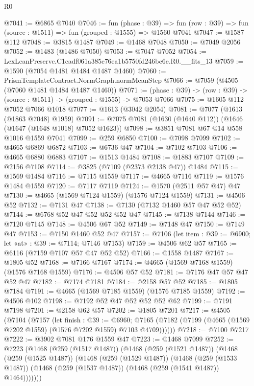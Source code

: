 \begin{lexlean}{R0}
\begin{coremodule}
@7041 := @6865 @7040
@7046 := fun (phase : @39) =>
  fun (row : @39) => fun (source : @1511) => fun (grouped : @1555) => @1560 @7041
@7047 := @1587 @112
@7048 := @3815 @1487
@7049 := @1468 @7048
@7050 := @7049 @2056
@7052 := @1483 (@1486 @7050)
@7053 := @7047 @7052
@7054 := LexLeanPreserve.C1cadf061a385c76ea1b5750fd246bc6e.R0.__fits_13
@7059 := @1590 (@7054 @1481 @1484 @1487 @1460)
@7060 := PrismTemplateContract.NormGraph.normMeanStep
@7066 := @7059 (@4505 (@7060 @1481 @1484 @1487 @1460))
@7071 := (phase : @39) -> (row : @39) -> (source : @1511) -> (grouped : @1555) -> @7053 @7066
@7075 := @1605 @112 @7052 @7066 @1018
@7077 := @1613 (@3042 @2054)
@7081 := @7077 (@1613 (@1863 @7048) @1959)
@7091 := @7075 @7081 (@1630 (@1640 @112)) (@1646 (@1647 (@1648 @1018) @7052 @1623))
@7098 := @3851 @7081 @67 @14 @558 @1016 @1559 @7041
@7099 := @259 @6850
@7100 := @7098 @7099
@7102 := @4665 @6869 @6872
@7103 := @6736 @47
@7104 := @7102 @7103
@7106 := @4665 @6880 @6883
@7107 := @1513 @1484
@7108 := @1883 @7107
@7109 := @2156 @7108
@7114 := @3825 (@7109 (@2373 @2138 @47)) @1484
@7115 := @1569 @1484
@7116 := @7115 @1559
@7117 := @4665 @7116
@7119 := @1576 @1484 @1559
@7120 := @7117 @7119
@7124 := @1570 (@2511 @57 @47) @47
@7130 := @4665 (@1569 @7124 @1559) (@1576 @7124 @1559)
@7131 := @4506 @52
@7132 := @7131 @47
@7138 := @7130 (@7132 @1460 @57 @47 @52 @52)
@7144 := @6768 @52 @47 @52 @52 @52 @47
@7145 := @7138 @7144
@7146 := @7120 @7145
@7148 := @4506 @67 @52
@7149 := @7148 @47
@7150 := @7149 @47
@7153 := @7150 @1460 @52 @47
@7157 := @7106 (let item : @39 := @6900; let «at» : @39 := @7114; @7146 @7153)
@7159 := @4506 @62 @57
@7165 := @6116 (@7159 @7107 @57 @47 @52 @52)
@7166 := @1558 @1487
@7167 := @1805 @52
@7168 := @7166 @7167
@7174 := @4665 (@1569 @7168 @1559) (@1576 @7168 @1559)
@7176 := @4506 @57 @52
@7181 := @7176 @47 @57 @47 @52 @47
@7182 := @7174 @7181
@7184 := @2158 @57 @52
@7185 := @1805 @7184
@7191 := @4665 (@1569 @7185 @1559) (@1576 @7185 @1559)
@7192 := @4506 @102
@7198 := @7192 @52 @47 @52 @52 @52 @62
@7199 := @7191 @7198
@7201 := @2158 @62 @57
@7202 := @1805 @7201
@7217 := @4505
    (@7104
      (@7157
        (let finish : @39 := @6960;
        @7165 (@7182 (@7199 (@4665 (@1569 @7202 @1559) (@1576 @7202 @1559) @7103 @4709))))))
@7218 := @7100 @7217
@7222 := @3902 @7081 @176 @1559 @47
@7223 := @1468 @7099
@7252 := @7223
    (@1468
      (@259 (@1517 @1487))
      (@1468
        (@259 (@1521 @1487))
        (@1468
          (@259 (@1525 @1487))
          (@1468
            (@259 (@1529 @1487))
            (@1468
              (@259 (@1533 @1487))
              (@1468 (@259 (@1537 @1487)) (@1468 (@259 (@1541 @1487)) @1464)))))))

\end{coremodule}
\end{lexlean}
